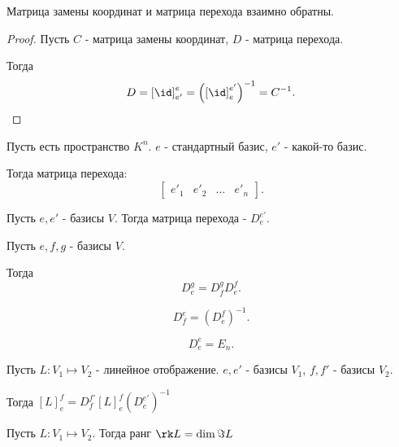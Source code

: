 \begin{statement} \thmslashn

    Матрица замены координат и матрица перехода взаимно обратны.
    \begin{proof} \thmslashn
    
        Пусть $C$ - матрица замены координат, $D$ - матрица перехода.

        Тогда
        \[ D = \left[\id\right]_{e'}^{e} = \left( \left[\id\right]_{e}^{e'} \right)^{-1} = C^{-1}  .\] 
    \end{proof}
\end{statement}
\begin{example} \thmslashn

    Пусть есть пространство $K^{n}$. $e$ - стандартный базис, $e'$ - какой-то базис.

    Тогда матрица перехода:
    \[ \begin{bmatrix} e'_{1} & e'_{2} & \ldots & e'_{n} \end{bmatrix}  .\] 
\end{example}
\begin{remark} \thmslashn

    Пусть $e, e'$ - базисы $V$. Тогда матрица перехода - $D_{e}^{e'}$.
\end{remark}
\begin{properties} \thmslashn

    Пусть $e, f, g$ - базисы $V$.

    Тогда
    \[ D_{e}^{g} = D_{f}^{g}D_{e}^{f} .\]

    \[ D_{f}^{e} = (D_{e}^{f})^{-1} .\]

    \[ D_{e}^{e} = E_{n} .\] 
\end{properties}
\begin{theorem} \thmslashn

    Пусть $L : V_1 \mapsto V_2$ - линейное отображение. $e, e'$ - базисы $V_1$, $f, f'$ - базисы $V_2$.

    Тогда $[L]_{e}^{f} = D_{f}^{f'}\left[L\right]_{e}^{f}\left(D_{e}^{e'}\right)^{-1}$
\end{theorem}
\begin{definition} \thmslashn 

Пусть $L : V_1 \mapsto V_2$. Тогда ранг $\rk L = \dim \Im L$
\end{definition}
